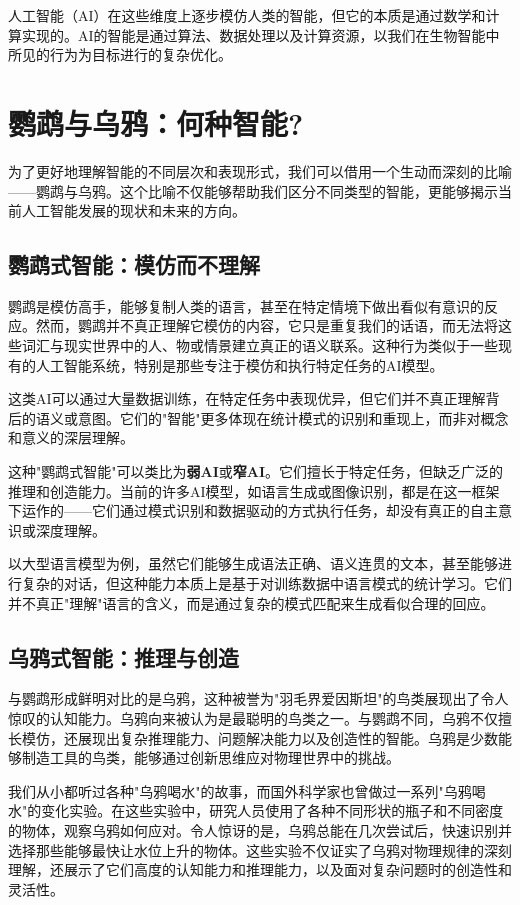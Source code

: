 人工智能（AI）在这些维度上逐步模仿人类的智能，但它的本质是通过数学和计算实现的。AI的智能是通过算法、数据处理以及计算资源，以我们在生物智能中所见的行为为目标进行的复杂优化。

\section{鹦鹉与乌鸦：何种智能?}

为了更好地理解智能的不同层次和表现形式，我们可以借用一个生动而深刻的比喻——鹦鹉与乌鸦。这个比喻不仅能够帮助我们区分不同类型的智能，更能够揭示当前人工智能发展的现状和未来的方向。

\subsection*{鹦鹉式智能：模仿而不理解}

鹦鹉是模仿高手，能够复制人类的语言，甚至在特定情境下做出看似有意识的反应。然而，鹦鹉并不真正理解它模仿的内容，它只是重复我们的话语，而无法将这些词汇与现实世界中的人、物或情景建立真正的语义联系。这种行为类似于一些现有的人工智能系统，特别是那些专注于模仿和执行特定任务的AI模型。

这类AI可以通过大量数据训练，在特定任务中表现优异，但它们并不真正理解背后的语义或意图。它们的"智能"更多体现在统计模式的识别和重现上，而非对概念和意义的深层理解。

这种"鹦鹉式智能"可以类比为\textbf{弱AI}或\textbf{窄AI}。它们擅长于特定任务，但缺乏广泛的推理和创造能力。当前的许多AI模型，如语言生成或图像识别，都是在这一框架下运作的——它们通过模式识别和数据驱动的方式执行任务，却没有真正的自主意识或深度理解。

以大型语言模型为例，虽然它们能够生成语法正确、语义连贯的文本，甚至能够进行复杂的对话，但这种能力本质上是基于对训练数据中语言模式的统计学习。它们并不真正"理解"语言的含义，而是通过复杂的模式匹配来生成看似合理的回应。

\subsection*{乌鸦式智能：推理与创造}

与鹦鹉形成鲜明对比的是乌鸦，这种被誉为"羽毛界爱因斯坦"的鸟类展现出了令人惊叹的认知能力。乌鸦向来被认为是最聪明的鸟类之一。与鹦鹉不同，乌鸦不仅擅长模仿，还展现出复杂推理能力、问题解决能力以及创造性的智能。乌鸦是少数能够制造工具的鸟类，能够通过创新思维应对物理世界中的挑战。

我们从小都听过各种"乌鸦喝水"的故事，而国外科学家也曾做过一系列"乌鸦喝水"的变化实验。在这些实验中，研究人员使用了各种不同形状的瓶子和不同密度的物体，观察乌鸦如何应对。令人惊讶的是，乌鸦总能在几次尝试后，快速识别并选择那些能够最快让水位上升的物体。这些实验不仅证实了乌鸦对物理规律的深刻理解，还展示了它们高度的认知能力和推理能力，以及面对复杂问题时的创造性和灵活性。

